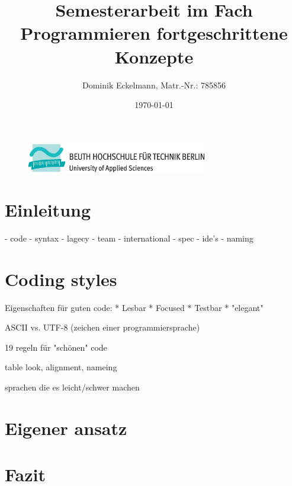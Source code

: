 \documentclass[a4paper]{article}
\title{Semesterarbeit im Fach Programmieren fortgeschrittene Konzepte}
\author{Dominik Eckelmann, Matr.-Nr.: 785856}
\date{\today}
\begin{document}
\sloppy

\begin{figure}[H]
	\centering
	\includegraphics[width=0.7\textwidth]{beuth.eps}
	\maketitle
\end{figure}

\newpage
\tableofcontents

\newpage
\section{Einleitung}


\cite{Knuth}
 - code
 - syntax
 - lagecy
 - team
 - international
 - spec
 - ide's
 - naming



\section{Coding styles}

Eigenschaften für guten code: \cite{Heusser}
  * Lesbar
  * Focused
  * Testbar
  * "elegant"

ASCII vs. UTF-8 (zeichen einer programmiersprache) \cite{Kamp}

19 regeln für "schönen" code \cite{Peters}

table look, alignment, nameing \cite{Green}

sprachen die es leicht/schwer machen \cite{Spinellis}

\section{Eigener ansatz}

\section{Fazit}

\appendix

\newpage

\nocite{*}
 
\printbibliography
{}

\newpage
 
\listoffigures

\newpage
 
\renewcommand\listoflistingscaption{Quellcodeverzeichnis}
\listoflistings
\end{document}

